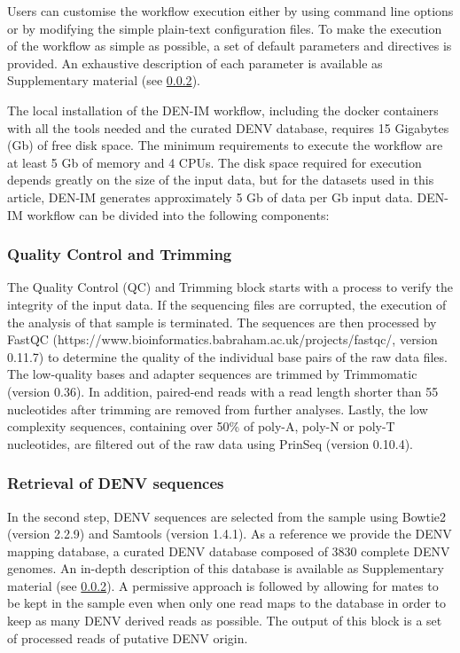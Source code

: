 Users can customise the workflow execution either by using command line options or by modifying the simple plain-text configuration files. To make the execution of the workflow as simple as possible, a set of default parameters and directives is provided. An exhaustive description of each parameter is available as Supplementary material (see \ref{}).

The local installation of the DEN-IM workflow, including the docker containers with all the tools needed and the curated DENV database, requires 15 Gigabytes (Gb) of free disk space. The minimum requirements to execute the workflow are at least 5 Gb of memory and 4 CPUs. The disk space required for execution depends greatly on the size of the input data, but for the datasets used in this article, DEN-IM generates approximately 5 Gb of data per Gb input data.
DEN-IM workflow can be divided into the following components:

\subsubsection{Quality Control and Trimming}

The Quality Control (QC) and Trimming block starts with a process to verify the integrity of the input data. If the sequencing files are corrupted, the execution of the analysis of that sample is terminated. The sequences are then processed by FastQC (https://www.bioinformatics.babraham.ac.uk/projects/fastqc/, version 0.11.7) to determine the quality of the individual base pairs of the raw data files. The low-quality bases and adapter sequences are trimmed by Trimmomatic \citep{schmieder_quality_2011} (version 0.36). In addition, paired-end reads with a read length shorter than 55 nucleotides after trimming are removed from further analyses. Lastly, the low complexity sequences, containing over 50\% of poly-A, poly-N or poly-T nucleotides, are filtered out of the raw data using PrinSeq \citep{schmieder_quality_2011} (version 0.10.4).

\subsubsection{Retrieval of DENV sequences}

In the second step, DENV sequences are selected from the sample using Bowtie2 \citep{langmead_fast_2012} (version 2.2.9) and Samtools \citep{langmead_fast_2012} (version 1.4.1). As a reference we provide the DENV mapping database, a curated DENV database composed of 3830 complete DENV genomes. An in-depth description of this database is available as Supplementary material (see \ref{}). A permissive approach is followed by allowing for mates to be kept in the sample even when only one read maps to the database in order to keep as many DENV derived reads as possible. The output of this block is a set of processed reads of putative DENV origin.

